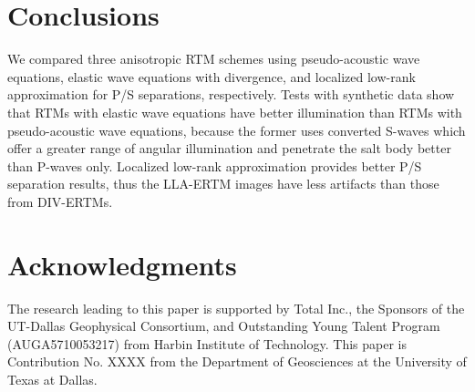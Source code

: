 \documentclass[manuscript,ulem,graphix,revised]{geophysics}
\begin{document}
\section{Conclusions}
\indent\indent
\marginnote{[29]}We compared three anisotropic RTM schemes using pseudo-acoustic wave equations, elastic wave equations with divergence, and localized low-rank approximation for P/S separations, respectively. Tests with synthetic data show that RTMs with elastic wave equations have better illumination\marginnote{[30]} than RTMs with pseudo-acoustic wave equations, because the former uses converted S-waves which offer a greater range of angular illumination and penetrate the salt body better than P-waves only. Localized low-rank approximation provides better P/S separation results, thus the LLA-ERTM images have less artifacts than those from DIV-ERTMs. 

\section{Acknowledgments}
\indent\indent
The research leading to this paper is supported by Total Inc., the Sponsors of the UT-Dallas Geophysical Consortium, and Outstanding Young Talent Program (AUGA5710053217) from Harbin Institute of Technology. This paper is Contribution No. XXXX from the Department of Geosciences at the University of Texas at Dallas.




%


%

\newpage


\end{document}
